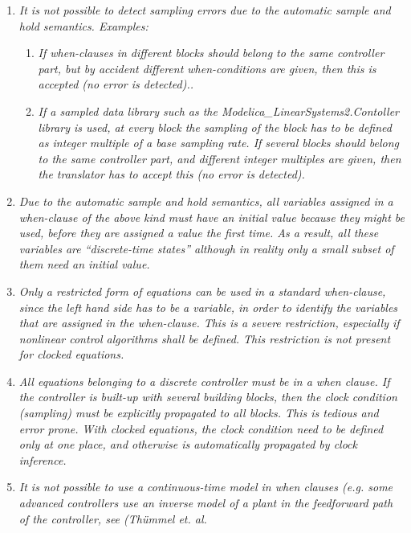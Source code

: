 \begin{enumerate}
\item
  \emph{It is not possible to detect sampling errors due to the
  automatic sample and hold semantics. Examples: }

  \begin{enumerate}
  \def\labelenumii{\alph{enumii}.}
  \item
    \emph{If when-clauses in different blocks should belong to the same
    controller part, but by accident different when-conditions are
    given, then this is accepted (no error is detected)..}
  \item
    \emph{If a sampled data library such as the
    Modelica\_LinearSystems2.Contoller library is used, at every block
    the sampling of the block has to be defined as integer multiple of a
    base sampling rate. If several blocks should belong to the same
    controller part, and different integer multiples are given, then the
    translator has to accept this (no error is detected).}
  \end{enumerate}
\item
  \emph{Due to the automatic sample and hold semantics, all variables
  assigned in a when-clause of the above kind must have an initial value
  because they might be used, before they are assigned a value the first
  time. As a result, all these variables are ``discrete-time states''
  although in reality only a small subset of them need an initial
  value.}
\item
  \emph{Only a restricted form of equations can be used in a standard
  when-clause, since the left hand side has to be a variable, in order
  to identify the variables that are assigned in the when-clause. This
  is a severe restriction, especially if nonlinear control algorithms
  shall be defined. This restriction is not present for clocked
  equations.}
\item
  \emph{All equations belonging to a discrete controller must be in a
  when clause. If the controller is built-up with several building
  blocks, then the clock condition (sampling) must be explicitly
  propagated to all blocks. This is tedious and error prone. With
  clocked equations, the clock condition need to be defined only at one
  place, and otherwise is automatically propagated by clock inference.}
\item
  \emph{It is not possible to use a continuous-time model in when
  clauses (e.g. some advanced controllers use an inverse model of a
  plant in the feedforward path of the controller, see (Thümmel et. al.
}
\end{enumerate}
